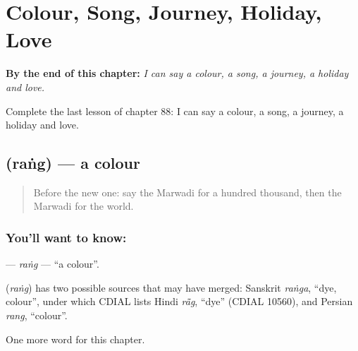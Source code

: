 
\chapter{Colour, Song, Journey, Holiday, Love}
\label{ch:mw-colour-song-journey-holiday-love}

\begin{chapteropening}
\textbf{By the end of this chapter:} \emph{I can say a colour, a song, a journey, a holiday and love.}

Complete the last lesson of chapter 88: I can say a colour, a song, a journey, a holiday and love.
\end{chapteropening}

\section[\texorpdfstring{\mw{रंग} (raṅg)}{रंग (raṅg)}]{ (raṅg) — a colour}

\label{lesson:MW-C88-rang}



\begin{quote}
Before the new one: say the Marwadi for a hundred thousand, then the Marwadi for the world.
\end{quote}

\subsection*{You'll want to know: }
\textbf{} — \emph{raṅg} — \textquotedblleft{}a colour\textquotedblright{}.

\begin{cousinweb}
\textbf{} (\emph{raṅg}) has two possible sources that may have merged: Sanskrit \emph{raṅga}, \textquotedblleft{}dye, colour\textquotedblright{}, under which CDIAL lists Hindi \emph{rā̃g}, \textquotedblleft{}dye\textquotedblright{} (CDIAL 10560), and Persian \emph{rang}, \textquotedblleft{}colour\textquotedblright{}.
\end{cousinweb}

\begin{grammarlens}[title={What you've built}]
One more word for this chapter.
\end{grammarlens}

